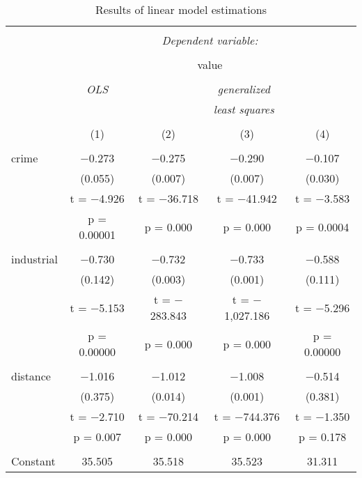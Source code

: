 \documentclass[
  12pt,
]{article}
\begin{document}
\begin{table}[htb] \centering 
    \caption{Results of linear model estimations} 
    \label{LS} 
    \small 
    \begin{tabular}{@{\extracolsep{5pt}}lcccc} 
        \\[-1.8ex]\hline 
        \hline \\[-1.8ex] 
        & \multicolumn{4}{c}{\textit{Dependent variable:}} \\ 
        \cline{2-5} 
        \\[-1.8ex] & \multicolumn{4}{c}{value} \\ 
        \\[-1.8ex] & \textit{OLS} & \multicolumn{3}{c}{\textit{generalized}} \\ 
        & \textit{} & \multicolumn{3}{c}{\textit{least squares}} \\ 
        \\[-1.8ex] & (1) & (2) & (3) & (4)\\ 
        \hline \\[-1.8ex] 
        crime & $-$0.273 & $-$0.275 & $-$0.290 & $-$0.107 \\ 
        & (0.055) & (0.007) & (0.007) & (0.030) \\ 
        & t = $-$4.926 & t = $-$36.718 & t = $-$41.942 & t = $-$3.583 \\ 
        & p = 0.00001 & p = 0.000 & p = 0.000 & p = 0.0004 \\ 
        & & & & \\ 
        industrial & $-$0.730 & $-$0.732 & $-$0.733 & $-$0.588 \\ 
        & (0.142) & (0.003) & (0.001) & (0.111) \\ 
        & t = $-$5.153 & t = $-$283.843 & t = $-$1,027.186 & t = $-$5.296 \\ 
        & p = 0.00000 & p = 0.000 & p = 0.000 & p = 0.00000 \\ 
        & & & & \\ 
        distance & $-$1.016 & $-$1.012 & $-$1.008 & $-$0.514 \\ 
        & (0.375) & (0.014) & (0.001) & (0.381) \\ 
        & t = $-$2.710 & t = $-$70.214 & t = $-$744.376 & t = $-$1.350 \\ 
        & p = 0.007 & p = 0.000 & p = 0.000 & p = 0.178 \\ 
        & & & & \\ 
        Constant & 35.505 & 35.518 & 35.523 & 31.311 \\ 

\end{tabular}
\end{table}
\end{document}
